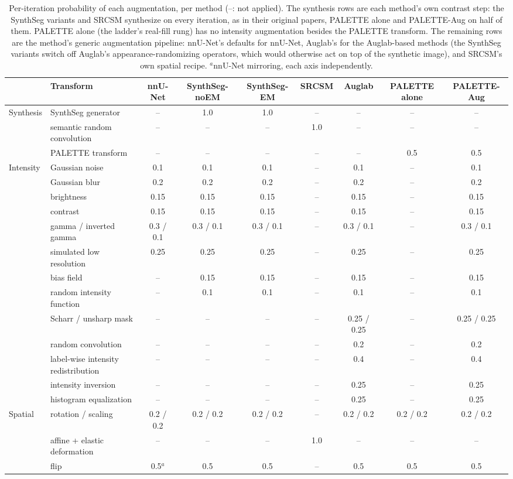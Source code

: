 \begin{table}[t]
\centering
\footnotesize
\setlength{\tabcolsep}{4pt}
\begin{tabular}{llccccccc}
\toprule
 & Transform & nnU-Net & SynthSeg-noEM & SynthSeg-EM & SRCSM & Auglab & PALETTE alone & PALETTE-Aug \\
\midrule
Synthesis & SynthSeg generator & -- & 1.0 & 1.0 & -- & -- & -- & -- \\
 & semantic random convolution & -- & -- & -- & 1.0 & -- & -- & -- \\
 & PALETTE transform & -- & -- & -- & -- & -- & 0.5 & 0.5 \\
\midrule
Intensity & Gaussian noise & 0.1 & 0.1 & 0.1 & -- & 0.1 & -- & 0.1 \\
 & Gaussian blur & 0.2 & 0.2 & 0.2 & -- & 0.2 & -- & 0.2 \\
 & brightness & 0.15 & 0.15 & 0.15 & -- & 0.15 & -- & 0.15 \\
 & contrast & 0.15 & 0.15 & 0.15 & -- & 0.15 & -- & 0.15 \\
 & gamma / inverted gamma & 0.3 / 0.1 & 0.3 / 0.1 & 0.3 / 0.1 & -- & 0.3 / 0.1 & -- & 0.3 / 0.1 \\
 & simulated low resolution & 0.25 & 0.25 & 0.25 & -- & 0.25 & -- & 0.25 \\
 & bias field & -- & 0.15 & 0.15 & -- & 0.15 & -- & 0.15 \\
 & random intensity function & -- & 0.1 & 0.1 & -- & 0.1 & -- & 0.1 \\
 & Scharr / unsharp mask & -- & -- & -- & -- & 0.25 / 0.25 & -- & 0.25 / 0.25 \\
 & random convolution & -- & -- & -- & -- & 0.2 & -- & 0.2 \\
 & label-wise intensity redistribution & -- & -- & -- & -- & 0.4 & -- & 0.4 \\
 & intensity inversion & -- & -- & -- & -- & 0.25 & -- & 0.25 \\
 & histogram equalization & -- & -- & -- & -- & 0.25 & -- & 0.25 \\
\midrule
Spatial & rotation / scaling & 0.2 / 0.2 & 0.2 / 0.2 & 0.2 / 0.2 & -- & 0.2 / 0.2 & 0.2 / 0.2 & 0.2 / 0.2 \\
 & affine + elastic deformation & -- & -- & -- & 1.0 & -- & -- & -- \\
 & flip & 0.5$^a$ & 0.5 & 0.5 & -- & 0.5 & 0.5 & 0.5 \\
\bottomrule
\end{tabular}
\caption{Per-iteration probability of each augmentation, per method (--: not
applied). The synthesis rows are each method's own contrast step: the SynthSeg
variants and SRCSM synthesize on every iteration, as in their original papers,
PALETTE alone and PALETTE-Aug on half of them. PALETTE alone (the ladder's
real-fill rung) has no intensity augmentation besides the PALETTE transform. The remaining rows are the method's generic
augmentation pipeline: nnU-Net's defaults for nnU-Net, Auglab's for the
Auglab-based methods (the SynthSeg variants switch off Auglab's
appearance-randomizing operators, which would otherwise act on top of the
synthetic image), and SRCSM's own spatial recipe. $^a$nnU-Net mirroring, each
axis independently.}
\label{tab:suppl-aug-probs}
\end{table}

